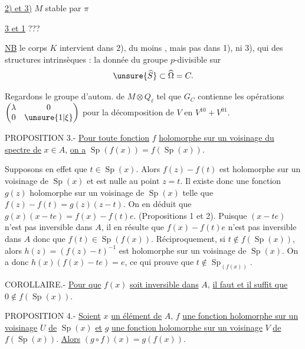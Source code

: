 \uline{2) et 3)} $M$ stable par $\pi$

\uline{3 et 1} ??? 

\uline{NB} le corps $K$ intervient dans 2), du moins , mais pas dans 1), ni 3), qui  des structures intrinsèques : la donnée du groupe $p$-divisible sur
\[
\unsure{\widehat S}\subset\widehat\Omega=C.
\]

Regardons le  groupe  d'autom.  de $M\otimes Q_\ell$  tel que $G_C$ contienne les opérations
$\begin{pmatrix}\lambda&0\\0&\unsure{1|\xi}\end{pmatrix}$ pour la décomposition de $V$ en $V^{10}+V^{01}$.



PROPOSITION 3.- \uline{Pour toute fonction} $f$ \uline{holomorphe sur un voisinage du spectre de} $x\in A$, \uline{on a} $\operatorname{Sp}(f(x))=f(\operatorname{Sp}(x))$.

Supposons en effet que $t\in\operatorname{Sp}(x)$. Alors $f(z)-f(t)$ est holomorphe sur un voisinage de $\operatorname{Sp}(x)$ et est nulle au point $z=t$. Il existe donc une fonction $g(z)$ holomorphe sur un voisinage de $\operatorname{Sp}(x)$ telle que $f(z)-f(t)=g(z)(z-t)$. On en déduit que $g(x)(x-te)=f(x)-f(t)e$. (Propositions 1 et 2). Puisque $(x-te)$ n'est pas inversible dans $A$, il en résulte que $f(x)-f(t)e$ n'est pas inversible dans $A$ donc que $f(t)\in\operatorname{Sp}(f(x))$. Réciproquement, si $t\notin f(\operatorname{Sp}(x))$, alors $h(z)=(f(z)-t)^{-1}$ est holomorphe sur un voisinage de $\operatorname{Sp}(x)$. On a donc $h(x)(f(x)-te)=e$, ce qui prouve que $t\notin\operatorname{Sp}_{(f(x))}$.

COROLLAIRE.- \uline{Pour que} $f(x)$ \uline{soit inversible dans} $A$, \uline{il faut et il suffit que} $0\notin f(\operatorname{Sp}(x))$.

PROPOSITION 4.- \uline{Soient} $x$ \uline{un élément de} $A$, $f$ \uline{une fonction holomorphe sur un voisinage} $U$ \uline{de} $\operatorname{Sp}(x)$ \uline{et} $g$ \uline{une fonction holomorphe sur un voisinage} $V$ \uline{de} $f(\operatorname{Sp}(x))$. \uline{Alors} $(g\circ f)(x)=g(f(x))$.

